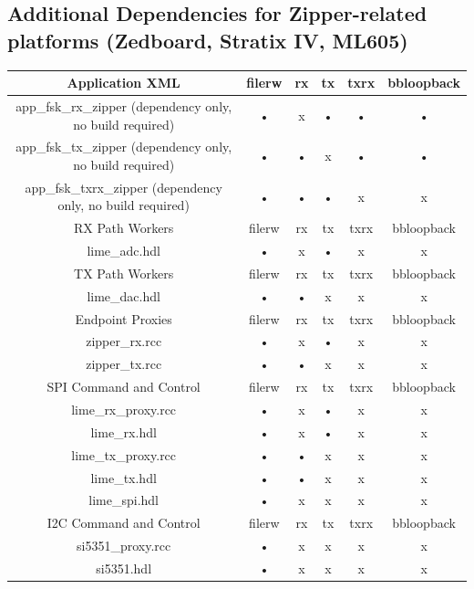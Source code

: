 \subsection{Additional Dependencies for Zipper-related platforms (Zedboard, Stratix IV, ML605)}
	\begin{tabular}{|c|c|c|c|c|c|}
	\hline
	\rowcolor{blue}
	Application XML & filerw & rx & tx & txrx & bbloopback \\
	\hline
	app\_fsk\_rx\_zipper (dependency only, no build required) & • & x & • & • & • \\
	\hline
	app\_fsk\_tx\_zipper (dependency only, no build required) & • & • & x & • & • \\
	\hline
	app\_fsk\_txrx\_zipper (dependency only, no build required) & • & • & • & x & x \\
	\hline
	\rowcolor{blue}
	RX Path Workers & filerw & rx & tx & txrx & bbloopback \\
	\hline
	lime\_adc.hdl & • & x & • & x & x \\
	\hline
	\rowcolor{blue}
	TX Path Workers & filerw & rx & tx & txrx & bbloopback \\
	\hline
	lime\_dac.hdl & • & • & x & x & x \\
	\hline
	\rowcolor{blue}
	Endpoint Proxies & filerw & rx & tx & txrx & bbloopback \\
	\hline
	zipper\_rx.rcc & • & x & • & x & x \\
	\hline
	zipper\_tx.rcc & • & • & x & x & x \\
	\hline
	\rowcolor{blue}
	SPI Command and Control & filerw & rx & tx & txrx & bbloopback \\
	\hline
	lime\_rx\_proxy.rcc & • & x & • & x & x \\
	\hline
	lime\_rx.hdl & • & x & • & x & x \\
	\hline
	lime\_tx\_proxy.rcc & • & • & x & x & x \\
	\hline
	lime\_tx.hdl & • & • & x & x & x \\
	\hline
	lime\_spi.hdl & • & x & x & x & x \\
	\hline
	\rowcolor{blue}
	I2C Command and Control & filerw & rx & tx & txrx & bbloopback \\
	\hline
	si5351\_proxy.rcc & • & x & x & x & x \\
	\hline
	si5351.hdl & • & x & x & x & x \\
	\hline
	\end{tabular}

	\newpage
